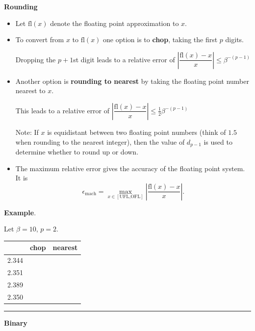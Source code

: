\documentclass[12pt,letterpaper,noanswers]{exam}
\begin{document}
\noindent\textbf{Rounding}
\begin{tcolorbox}
\begin{itemize}
\itemsep0pt
    \item Let $\text{fl}(x)$ denote the floating point approximation to $x$.
    \item To convert from $x$ to $\text{fl}(x)$ one option is to \textbf{chop}, taking the first $p$ digits.  
    
    Dropping the $p+1$st digit leads to a relative error of $\left\vert\dfrac{\text{fl}(x) - x}{x}\right\vert\leq \beta^{-(p-1)}$
    \item Another option is \textbf{rounding to nearest} by taking the floating point number nearest to $x$.  
    
    This leads to a relative error of $\left\vert\dfrac{\text{fl}(x) - x}{x}\right\vert\leq \frac{1}{2}\beta^{-(p-1)}$
    
    Note: If $x$ is equidistant between two floating point numbers (think of $1.5$ when rounding to the nearest integer), then the value of $d_{p-1}$ is used to determine whether to round up or down.  
    \item The maximum relative error gives the accuracy of the floating point system.  It is \[\epsilon_{\text{mach}} = \max\limits_{x\in[\text{UFL,OFL}]} \left\vert\dfrac{\text{fl}(x) - x}{x}\right\vert.\]
\end{itemize}
\end{tcolorbox}

\noindent\textbf{Example}.

Let $\beta = 10$, $p =2$.

\begin{tabular}{c|c|c}
     & chop & nearest \\
     \hline
  2.344   & & \\
2.351 & & \\
2.389 & & \\
2.350 & & \\
\end{tabular}


\vspace{0.2cm}
\hrule
\vspace{0.2cm}
\noindent\textbf{Binary}
\end{document}
